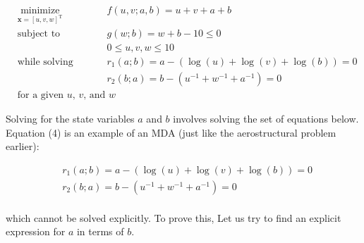 \documentclass[11pt]{article}
\begin{document}
\begin{equation*}
    \begin{aligned}
        & \underset{\mathbf{x} = \left[u,v,w\right]^\mathrm{T}}{\text{minimize}}
        & & f(u,v;a,b) = u+v+a+b\\
        & \text{subject to}
        & & g(w;b) = w + b -10 \leq 0\\
        & & & 0 \leq u,v,w \leq 10\\
        & \text{while solving}
        & & r_1(a;b) = a - \left(\log(u) + \log(v) + \log(b)\right) = 0\\
        & & & r_2(b;a) = b - \left(u^{-1} + w^{-1} + a^{-1}\right) = 0\\
        & \text{for a given $u$, $v$, and $w$}
    \end{aligned}
    \tag{3}
\end{equation*}

Solving for the state variables \(a\) and \(b\) involves solving the set
of equations below. Equation (4) is an example of an MDA (just like the
aerostructural problem earlier):

\begin{equation*}
    \begin{aligned}
        & r_1(a;b) = a - \left(\log(u) + \log(v) + \log(b)\right) = 0\\
        & r_2(b;a) = b - \left(u^{-1} + w^{-1} + a^{-1}\right) = 0\\
    \end{aligned}
    \tag{4}
\end{equation*}

which cannot be solved explicitly. To prove this, Let us try to find an
explicit expression for \(a\) in terms of \(b\).
\end{document}
